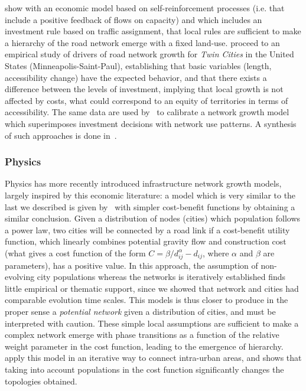 \documentclass[10pt]{article}
\begin{document}
\cite{yerra2005emergence} show with an economic model based on self-reinforcement processes (i.e. that include a positive feedback of flows on capacity) and which includes an investment rule based on traffic assignment, that local rules are sufficient to make a hierarchy of the road network emerge with a fixed land-use. \cite{levinson2003induced} proceed to an empirical study of drivers of road network growth for \emph{Twin Cities} in the United States (Minneapolis-Saint-Paul), establishing that basic variables (length, accessibility change) have the expected behavior, and that there exists a difference between the levels of investment, implying that local growth is not affected by costs, what could correspond to an equity of territories in terms of accessibility. The same data are used by~\cite{zhang2016model} to calibrate a network growth model which superimposes investment decisions with network use patterns. A synthesis of such approaches is done in~\cite{xie2011evolving}.
 
\subsubsection{Physics}
 
Physics has more recently introduced infrastructure network growth models, largely inspired by this economic literature: a model which is very similar to the last we described is given by~\cite{louf2013emergence} with simpler cost-benefit functions by obtaining a similar conclusion. Given a distribution of nodes (cities) which population follows a power law, two cities will be connected by a road link if a cost-benefit utility function, which linearly combines potential gravity flow and construction cost (what gives a cost function of the form $C = \beta / d_{ij}^{\alpha} - d_{ij}$, where $\alpha$ and $\beta$ are parameters), has a positive value. In this approach, the assumption of non-evolving city populations whereas the networks is iteratively established finds little empirical or thematic support, since we showed that network and cities had comparable evolution time scales. This models is thus closer to produce in the proper sense a \emph{potential network} given a distribution of cities, and must be interpreted with caution. These simple local assumptions are sufficient to make a complex network emerge with phase transitions as a function of the relative weight parameter in the cost function, leading to the emergence of hierarchy. \cite{zhao2016population} apply this model in an iterative way to connect intra-urban areas, and shows that taking into account populations in the cost function significantly changes the topologies obtained.
 
\end{document}
